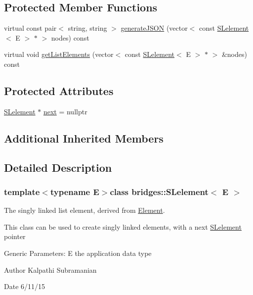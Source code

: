 \subsection*{Protected Member Functions}
\begin{DoxyCompactItemize}
\item 
virtual const pair$<$ string, string $>$ \hyperlink{classbridges_1_1_s_lelement_a51933b217a7cdd05b348554a249cbc9f}{generate\+J\+S\+O\+N} (vector$<$ const \hyperlink{classbridges_1_1_s_lelement}{S\+Lelement}$<$ E $>$ $\ast$ $>$ nodes) const 
\item 
virtual void \hyperlink{classbridges_1_1_s_lelement_ad3c3ec822844c7daa239843386702260}{get\+List\+Elements} (vector$<$ const \hyperlink{classbridges_1_1_s_lelement}{S\+Lelement}$<$ E $>$ $\ast$ $>$ \&nodes) const 
\end{DoxyCompactItemize}
\subsection*{Protected Attributes}
\begin{DoxyCompactItemize}
\item 
\hyperlink{classbridges_1_1_s_lelement}{S\+Lelement} $\ast$ \hyperlink{classbridges_1_1_s_lelement_ad7449d10a09ebc52653a7baed812aa43}{next} = nullptr
\end{DoxyCompactItemize}
\subsection*{Additional Inherited Members}


\subsection{Detailed Description}
\subsubsection*{template$<$typename E$>$class bridges\+::\+S\+Lelement$<$ E $>$}

The singly linked list element, derived from \hyperlink{classbridges_1_1_element}{Element}. 

This class can be used to create singly linked elements, with a next \hyperlink{classbridges_1_1_s_lelement}{S\+Lelement} pointer

Generic Parameters\+: E the application data type

\begin{DoxyAuthor}{Author}
Kalpathi Subramanian 
\end{DoxyAuthor}
\begin{DoxyDate}{Date}
6/11/15 
\end{DoxyDate}



